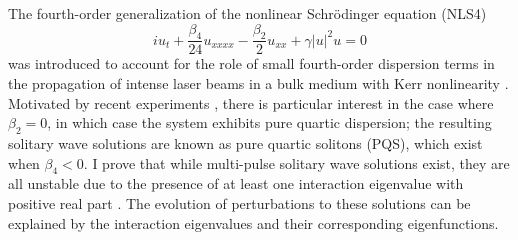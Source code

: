 \documentclass[11pt,reqno,oneside]{article}
\theoremstyle{definition}
\theoremstyle{remark}
\begin{document}
The fourth-order generalization of the nonlinear Schr{\"o}dinger equation (NLS4)
\[
i u_t + \frac{\beta_4}{24}u_{xxxx} - \frac{\beta_2}{2}u_{xx} + \gamma |u|^2 u = 0
\]
was introduced to account for the role of small fourth-order dispersion terms in the propagation of intense laser beams in a bulk medium with Kerr nonlinearity \cite{Karpman2000,Tam2020}. Motivated by recent experiments \cite{Tam2019}, there is particular interest in the case where $\beta_2 = 0$, in which case the system exhibits pure quartic dispersion; the resulting solitary wave solutions are known as pure quartic solitons (PQS), which exist when $\beta_4 < 0$. I prove that while multi-pulse solitary wave solutions exist, they are all unstable due to the presence of at least one interaction eigenvalue with positive real part \cite[Theorems 1 and 2]{Parker2020NLS4}. The evolution of perturbations to these solutions can be explained by the interaction eigenvalues and their corresponding eigenfunctions.
\end{document}

